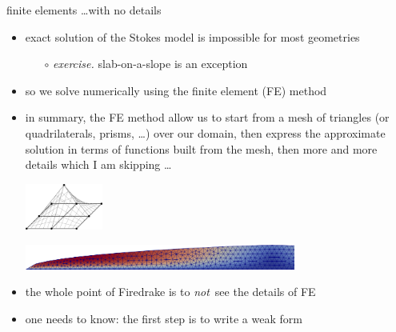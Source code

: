 \documentclass[10pt,
               hyperref={colorlinks,citecolor=DeepPink4,linkcolor=black,urlcolor=blue},
               svgnames]{beamer}
\begin{document}
\begin{frame}{finite elements \dots with no details}

\begin{itemize}
\item exact solution of the Stokes model is impossible for most geometries
    \begin{itemize}
    \item[$\circ$] \emph{exercise.}  slab-on-a-slope is an exception
    \end{itemize}
\item so we solve numerically using the finite element (FE) method
\item in summary, the FE method allow us to start from a mesh of triangles {\small (or quadrilaterals, prisms, \dots) over our domain, {\footnotesize then express the approximate solution in terms of functions built from the mesh, {\scriptsize then more and more details which I am skipping \dots}}}

\medskip
\includegraphics[width=0.2\textwidth]{figs/hat.png} \hfill

\vspace{-9mm}
\hfill \includegraphics[width=0.7\textwidth]{figs/stage2.png}

\bigskip
\item \alert{the whole point of Firedrake is to \emph{not}\, see the details of FE}
\item one needs to know: the first step is to write a weak form
\end{itemize}
\end{frame}
\end{document}
